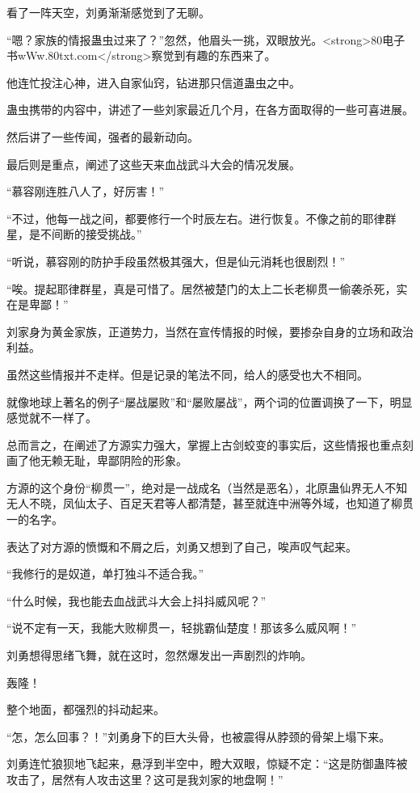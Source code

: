 \begin{this_body}
看了一阵天空，刘勇渐渐感觉到了无聊。

“嗯？家族的情报蛊虫过来了？”忽然，他眉头一挑，双眼放光。<strong>80电子书wWw.80txt.com</strong>察觉到有趣的东西来了。

他连忙投注心神，进入自家仙窍，钻进那只信道蛊虫之中。

蛊虫携带的内容中，讲述了一些刘家最近几个月，在各方面取得的一些可喜进展。

然后讲了一些传闻，强者的最新动向。

最后则是重点，阐述了这些天来血战武斗大会的情况发展。

“慕容刚连胜八人了，好厉害！”

“不过，他每一战之间，都要修行一个时辰左右。进行恢复。不像之前的耶律群星，是不间断的接受挑战。”

“听说，慕容刚的防护手段虽然极其强大，但是仙元消耗也很剧烈！”

“唉。提起耶律群星，真是可惜了。居然被楚门的太上二长老柳贯一偷袭杀死，实在是卑鄙！”

刘家身为黄金家族，正道势力，当然在宣传情报的时候，要掺杂自身的立场和政治利益。

虽然这些情报并不走样。但是记录的笔法不同，给人的感受也大不相同。

就像地球上著名的例子“屡战屡败”和“屡败屡战”，两个词的位置调换了一下，明显感觉就不一样了。

总而言之，在阐述了方源实力强大，掌握上古剑蛟变的事实后，这些情报也重点刻画了他无赖无耻，卑鄙阴险的形象。

方源的这个身份“柳贯一”，绝对是一战成名（当然是恶名），北原蛊仙界无人不知无人不晓，凤仙太子、百足天君等人都清楚，甚至就连中洲等外域，也知道了柳贯一的名字。

表达了对方源的愤慨和不屑之后，刘勇又想到了自己，唉声叹气起来。

“我修行的是奴道，单打独斗不适合我。”

“什么时候，我也能去血战武斗大会上抖抖威风呢？”

“说不定有一天，我能大败柳贯一，轻挑霸仙楚度！那该多么威风啊！”

刘勇想得思绪飞舞，就在这时，忽然爆发出一声剧烈的炸响。

轰隆！

整个地面，都强烈的抖动起来。

“怎，怎么回事？！”刘勇身下的巨大头骨，也被震得从脖颈的骨架上塌下来。

刘勇连忙狼狈地飞起来，悬浮到半空中，瞪大双眼，惊疑不定：“这是防御蛊阵被攻击了，居然有人攻击这里？这可是我刘家的地盘啊！”


\end{this_body}
